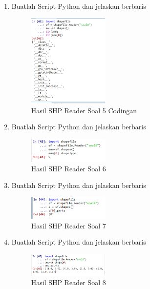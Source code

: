 \begin{enumerate}
    \item Buatlah Script Python dan jelaskan berbaris
    
    \hfill\break
    \begin{figure}[H]
		\includegraphics[width=4cm]{figures/1174026/3/5.png}
		\centering
		\caption{Hasil SHP Reader Soal 5 Codingan}
    \end{figure}

    \item Buatlah Script Python dan jelaskan berbaris
    
    \hfill\break
    \begin{figure}[H]
		\includegraphics[width=4cm]{figures/1174026/3/6.png}
		\centering
		\caption{Hasil SHP Reader Soal 6}
    \end{figure}

    \item Buatlah Script Python dan jelaskan berbaris
    
    \hfill\break
    \begin{figure}[H]
		\includegraphics[width=4cm]{figures/1174026/3/7.png}
		\centering
		\caption{Hasil SHP Reader Soal 7}
    \end{figure}

    \item Buatlah Script Python dan jelaskan berbaris
    
    \hfill\break
    \begin{figure}[H]
		\includegraphics[width=4cm]{figures/1174026/3/8.png}
		\centering
		\caption{Hasil SHP Reader Soal 8}
    \end{figure}


\end{enumerate}
